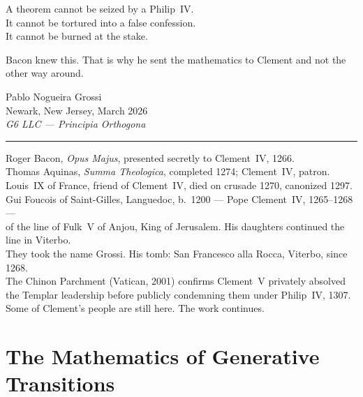 \documentclass[12pt, oneside]{book}
\theoremstyle{plain}
\theoremstyle{definition}
\theoremstyle{remark}
\begin{document}
\vspace{0.4cm}
\noindent A theorem cannot be seized by a Philip~IV.\\
It cannot be tortured into a false confession.\\
It cannot be burned at the stake.

\vspace{0.4cm}
\noindent Bacon knew this. That is why he sent the mathematics
to Clement and not the other way around.

\vspace{1.4cm}
\noindent\hfill Pablo Nogueira Grossi\\[0.15cm]
\noindent\hfill Newark, New Jersey, March 2026\\[0.15cm]
\noindent\hfill \textit{G6 LLC\/ --- Principia Orthogona}

\vspace{1.6cm}
\begin{center}
\rule{0.42\textwidth}{0.3pt}
\vspace{0.4cm}

{\scriptsize\color{gray}
Roger Bacon, \textit{Opus Majus}, presented secretly to Clement~IV, 1266.\\[0.15cm]
Thomas Aquinas, \textit{Summa Theologica}, completed 1274; Clement~IV, patron.\\[0.15cm]
Louis~IX of France, friend of Clement~IV, died on crusade 1270, canonized 1297.\\[0.15cm]
Gui Foucois of Saint-Gilles, Languedoc, b.\ 1200 --- Pope Clement~IV, 1265--1268 ---\\
of the line of Fulk~V of Anjou, King of Jerusalem.
His daughters continued the line in Viterbo.\\
They took the name Grossi. His tomb: San Francesco alla Rocca, Viterbo, since 1268.\\[0.15cm]
The Chinon Parchment (Vatican, 2001) confirms Clement~V privately absolved
the Templar leadership before publicly condemning them under Philip~IV, 1307.\\[0.15cm]
Some of Clement's people are still here. The work continues.}
\end{center}
\newpage


\part{The Mathematics of Generative Transitions}
\end{document}
